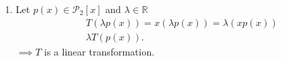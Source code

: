 \documentclass{report}
\begin{document}
{{\begin{enumerate}[label=(\roman*)]
 \[
 T \left( p \left( x \right) + q \left( x \right)  \right) = x \left( p \left( x \right) + q \left( x \right)  \right) = x \left( p \left( x \right)  \right) + x \left( q \left( x \right)  \right) 
 .\]        
 \[
 = T \left(  p \left( x \right)  \right) + T \left( q \left( x \right)  \right) 
 .\] 
\item                     Let $ p \left( x \right)  \in \mathcal{P}_2 \left[  x\right] $ and $ \lambda \in \mathbb{R}$
 \begin{align*}
 	T \left( \lambda p\left( x \right)  \right) = x \left( \lambda p \left( x \right)  \right) = \lambda \left( x p\left( x \right)  \right) \\
	\lambda T \left( p \left( x \right)  \right) 
 .\end{align*}  
 $ \implies T$ is a linear transformation.
\end{enumerate}
   }
   
}
\end{document}
